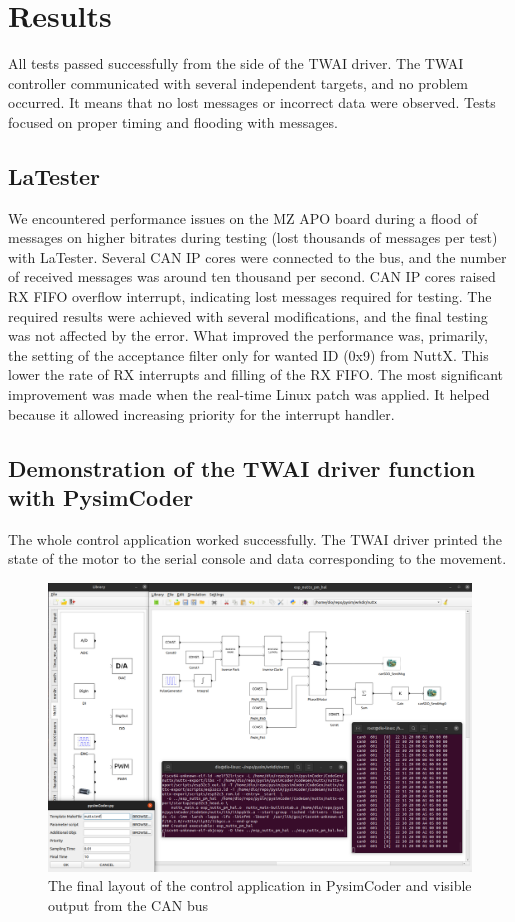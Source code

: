 \documentclass{ctuthesis}
\begin{document}
 \section{Results}
 All tests passed successfully from the side of the TWAI driver. The TWAI controller communicated with several independent targets, and no problem occurred. It means that no lost messages or incorrect data were observed. Tests focused on proper timing and flooding with messages.
 
 \subsection{LaTester}
 We encountered performance issues on the MZ APO board during a flood of messages on higher bitrates during testing (lost thousands of messages per test) with LaTester. Several CAN IP cores were connected to the bus, and the number of received messages was around ten thousand per second. CAN IP cores raised RX FIFO overflow interrupt, indicating lost messages required for testing. The required results were achieved with several modifications, and the final testing was not affected by the error. What improved the performance was, primarily, the setting of the acceptance filter only for wanted ID (0x9) from NuttX. This lower the rate of RX interrupts and filling of the RX FIFO. The most significant improvement was made when the real-time Linux patch was applied. It helped because it allowed increasing priority for the interrupt handler.

 \subsection{Demonstration of the TWAI driver function with PysimCoder}
 The whole control application worked successfully. The TWAI driver printed the state of the motor to the serial console and data corresponding to the movement.
  \begin{figure}[htb]
 \includegraphics[width=1\textwidth]{images/pysim_nuttx_3pmot_spi_can.pdf}
 \caption{The final layout of the control application in PysimCoder and visible output from the CAN bus \cite{thesis-beqiri}}
 \end{figure}
 
\end{document}
